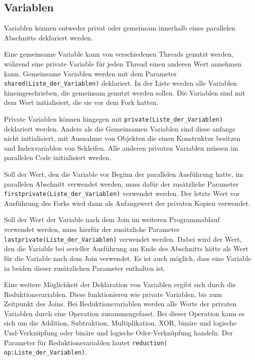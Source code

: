 \documentclass[../main.tex]{subfiles}
\begin{document}
\subsection{Variablen}

Variablen können entweder privat oder gemeinsam innerhalb eines parallelen Abschnitts deklariert werden. \par Eine gemeinsame Variable kann von verschiedenen Threads genutzt werden, während eine private Variable für jeden Thread einen anderen Wert annehmen kann. Gemeinsame Variablen werden mit dem Parameter \texttt{shared(Liste\_der\_Variablen)} deklariert. In der Liste werden alle Variablen hineingeschrieben, die gemeinsam genutzt werden sollen. Die Variablen sind mit dem Wert initialisiert, die sie vor dem Fork hatten. \par Private Variablen können hingegen mit \texttt{private(Liste\_der\_Variablen)} deklariert werden.  Anders als die Gemeinsamen Variablen sind diese anfangs nicht initialisiert, mit Ausnahme von Objekten die einen Konstruktur besitzen und Indexvariablen von Schleifen. Alle anderen privaten Variablen müssen im parallelen Code initialisiert werden. \par
Soll der Wert, den die Variable vor Beginn der parallelen Ausführung hatte, im parallelen Abschnitt verwendet werden, muss dafür der zusätzliche Parameter \texttt{firstprivate(Liste\_der\_Variablen)} verwendet werden. Der letzte Wert vor Ausführung des Forks wird dann als Anfangswert der privaten Kopien verwendet. \par Soll der Wert der Variable nach dem Join im weiteren Programmablauf verwendet werden, muss hierfür der zusätzliche Parameter \texttt{lastprivate(Liste\_der\_Variablen)} verwendet werden. Dabei wird der Wert, den die Variable bei serieller Ausführung am Ende des Abschnitts hätte als Wert für die Variable nach dem Join verwendet. Es ist auch möglich, dass eine Variable in beiden dieser zusätzlichen Parameter enthalten ist.

Eine weitere Möglichkeit der Deklaration von Variablen ergibt sich durch die Reduktionsvariablen. Diese funktionieren wie private Variablen, bis zum Zeitpunkt des Joins. Bei Reduktionsvariablen werden alle Werte der privaten Variablen durch eine Operation zusammengefasst. Bei dieser Operation kann es sich um die Addition, Subtraktion, Multiplikation, XOR, binäre und logische Und-Verknüpfung oder binäre und logische Oder-Verknüpfung handeln. Der Parameter für Reduktionsvariablen lautet \texttt{reduction( op:Liste\_der\_Variablen)}.
\end{document}
